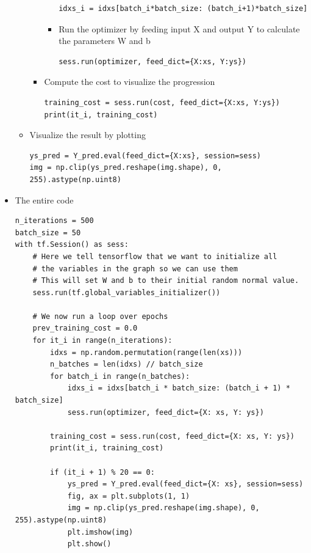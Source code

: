 \documentclass[12pt,a4paper]{article}
\begin{document}
\begin{itemize}
\begin{itemize}
\begin{itemize}
\begin{itemize}
\begin{lstlisting}
idxs_i = idxs[batch_i*batch_size: (batch_i+1)*batch_size]
\end{lstlisting}
\item Run the optimizer by feeding input X and output Y to calculate the parameters W and b
\begin{lstlisting}
sess.run(optimizer, feed_dict={X:xs, Y:ys})
\end{lstlisting}
\end{itemize}
\item Compute the cost to visualize the progression
\begin{lstlisting}
training_cost = sess.run(cost, feed_dict={X:xs, Y:ys})
print(it_i, training_cost)
\end{lstlisting}
\end{itemize}
\item Visualize the result by plotting
\begin{lstlisting}
ys_pred = Y_pred.eval(feed_dict={X:xs}, session=sess)
img = np.clip(ys_pred.reshape(img.shape), 0, 255).astype(np.uint8)
\end{lstlisting}
\end{itemize}
\item The entire code
\begin{lstlisting}
n_iterations = 500
batch_size = 50
with tf.Session() as sess:
    # Here we tell tensorflow that we want to initialize all
    # the variables in the graph so we can use them
    # This will set W and b to their initial random normal value.
    sess.run(tf.global_variables_initializer())

    # We now run a loop over epochs
    prev_training_cost = 0.0
    for it_i in range(n_iterations):
        idxs = np.random.permutation(range(len(xs)))
        n_batches = len(idxs) // batch_size
        for batch_i in range(n_batches):
            idxs_i = idxs[batch_i * batch_size: (batch_i + 1) * batch_size]
            sess.run(optimizer, feed_dict={X: xs, Y: ys})

        training_cost = sess.run(cost, feed_dict={X: xs, Y: ys})
        print(it_i, training_cost)

        if (it_i + 1) % 20 == 0:
            ys_pred = Y_pred.eval(feed_dict={X: xs}, session=sess)
            fig, ax = plt.subplots(1, 1)
            img = np.clip(ys_pred.reshape(img.shape), 0, 255).astype(np.uint8)
            plt.imshow(img)
            plt.show()
\end{lstlisting}
\end{itemize}
\end{document}
